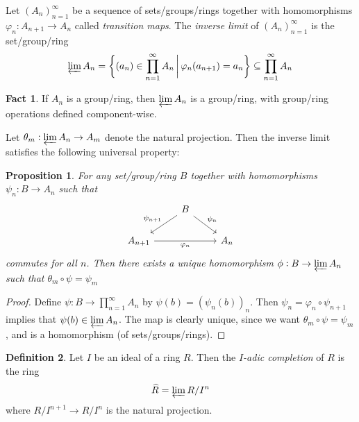 \documentclass[11pt]{article}
\theoremstyle{definition}
\newtheorem{definition}{Definition}[subsection]
\newtheorem*{fact}{Fact}
\theoremstyle{plain}
\newtheorem{proposition}[definition]{Proposition}
\theoremstyle{remark}
\begin{document}
Let $(A_n)_{n=1}^\infty$ be a sequence of sets/groups/rings together with homomorphisms $\varphi_n : A_{n+1} \to A_n$ called \emph{transition maps}. The \emph{inverse limit} of $(A_n)_{n=1}^\infty$ is the set/group/ring
\begin{equation*}
    \varprojlim A_n = \bigg\{(a_n) \in \prod_{n=1}^\infty A_n \,\bigg\vert\, \varphi_n(a_{n+1}) = a_n\bigg\} \subseteq \prod_{n=1}^\infty A_n
\end{equation*}

\begin{fact}
    If $A_n$ is a group/ring, then $\varprojlim A_n$ is a group/ring, with group/ring operations defined component-wise.
\end{fact}

Let $\theta_m : \varprojlim A_n \to A_m$ denote the natural projection. Then the inverse limit satisfies the following universal property:

\begin{proposition}\label{prop:3_3}
    For any set/group/ring $B$ together with homomorphisms $\psi_n : B \to A_n$ such that
    \begin{equation*}
    \begin{tikzcd}
        & B \arrow[ld, "\psi_{n+1}"'] \arrow[rd, "\psi_n"] &\\
        A_{n+1} \arrow[rr, "\varphi_n"'] & & A_n
    \end{tikzcd}
    \end{equation*}
    commutes for all $n$. Then there exists a unique homomorphism $\phi : B \to \varprojlim A_n$ such that $\theta_m \circ \psi = \psi_m$
\end{proposition}
\begin{proof}
    Define $\psi : B \to \prod_{n=1}^\infty A_n$ by $\psi(b) = (\psi_n(b))_n$. Then $\psi_n = \varphi_n \circ \psi_{n+1}$ implies that $\psi(b) \in \varprojlim A_n$. The map is clearly unique, since we want $\theta_m \circ \psi = \psi_m$, and is a homomorphism (of sets/groups/rings).
\end{proof}

\begin{definition}\label{def:3_4}
    Let $I$ be an ideal of a ring $R$. Then the \emph{$I$-adic completion} of $R$ is the ring
    \begin{equation*}
        \widehat{R} = \varprojlim R/I^n
    \end{equation*}
    where $R/I^{n+1} \to R/I^n$ is the natural projection.
\end{definition}
\end{document}
